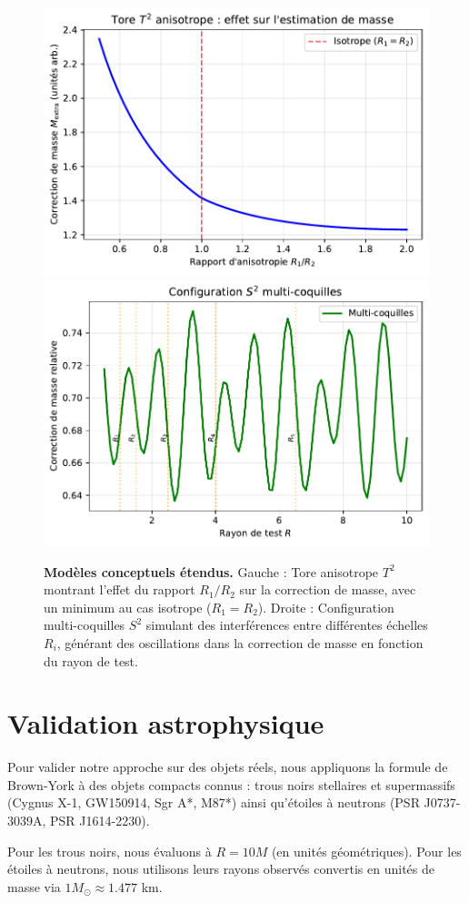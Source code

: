 \documentclass[11pt]{article}
\begin{document}
\begin{figure}[!htb]
\centering
\includegraphics[width=.48\linewidth]{fig_torus_anisotropic.pdf}
\includegraphics[width=.48\linewidth]{fig_sphere_multishell.pdf}
\caption{\textbf{Modèles conceptuels étendus.} Gauche : Tore anisotrope $T^2$ montrant l'effet du rapport $R_1/R_2$ sur la correction de masse, avec un minimum au cas isotrope ($R_1=R_2$). Droite : Configuration multi-coquilles $S^2$ simulant des interférences entre différentes échelles $R_i$, générant des oscillations dans la correction de masse en fonction du rayon de test.}
\end{figure}
\clearpage

\section{Validation astrophysique}
\label{sec:validation}

Pour valider notre approche sur des objets réels, nous appliquons la formule de Brown-York à des objets compacts connus : trous noirs stellaires et supermassifs (Cygnus X-1, GW150914, Sgr A*, M87*) ainsi qu'étoiles à neutrons (PSR J0737-3039A, PSR J1614-2230).

Pour les trous noirs, nous évaluons à $R = 10M$ (en unités géométriques). Pour les étoiles à neutrons, nous utilisons leurs rayons observés convertis en unités de masse via $1 M_\odot \approx 1.477$ km.
\end{document}
